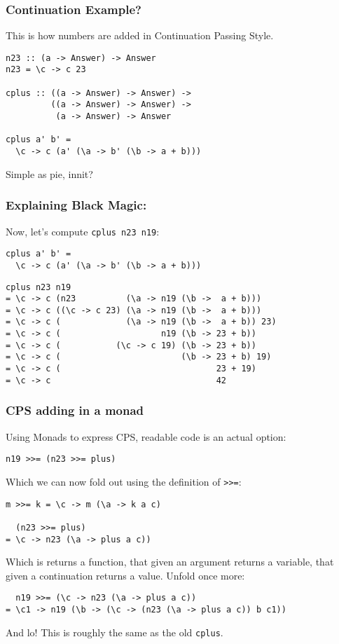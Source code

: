 \documentclass{beamer}
\begin{document}
\begin{frame}[fragile]
\frametitle{Continuation Example?}
\lstset{basicstyle=\footnotesize\ttfamily}
This is how numbers are added in Continuation Passing Style.
\begin{lstlisting}
n23 :: (a -> Answer) -> Answer
n23 = \c -> c 23

cplus :: ((a -> Answer) -> Answer) -> 
         ((a -> Answer) -> Answer) -> 
          (a -> Answer) -> Answer
          
cplus a' b' = 
  \c -> c (a' (\a -> b' (\b -> a + b)))
\end{lstlisting}
\pause Simple as pie, innit?
\end{frame}

\begin{frame}[fragile]
\frametitle{Explaining Black Magic:}
\lstset{basicstyle=\footnotesize\ttfamily}
Now, let's compute \texttt{cplus n23 n19}: 
\begin{lstlisting}
cplus a' b' = 
  \c -> c (a' (\a -> b' (\b -> a + b)))
\end{lstlisting}
\pause
\begin{lstlisting}
cplus n23 n19
= \c -> c (n23          (\a -> n19 (\b ->  a + b))) 
= \c -> c ((\c -> c 23) (\a -> n19 (\b ->  a + b)))
= \c -> c (             (\a -> n19 (\b ->  a + b)) 23)
= \c -> c (                    n19 (\b -> 23 + b))
= \c -> c (           (\c -> c 19) (\b -> 23 + b))
= \c -> c (                        (\b -> 23 + b) 19)
= \c -> c (                               23 + 19)
= \c -> c                                 42
\end{lstlisting}
\lstset{language=Haskell}


\end{frame}



\begin{frame}[fragile]
\frametitle{CPS adding in a monad}
Using Monads to express CPS, readable code is an actual option:

\begin{lstlisting}
n19 >>= (n23 >>= plus)
\end{lstlisting}
Which we can now fold out using the definition of \texttt{>>=}:
\pause
\begin{lstlisting}
m >>= k = \c -> m (\a -> k a c)

  (n23 >>= plus)
= \c -> n23 (\a -> plus a c))
\end{lstlisting}
Which is returns a function, that given an argument returns a variable, that
given a continuation returns a value. Unfold once more:
\pause
\begin{lstlisting}
  n19 >>= (\c -> n23 (\a -> plus a c))
= \c1 -> n19 (\b -> (\c -> (n23 (\a -> plus a c)) b c1))
\end{lstlisting}

\pause And lo! This is roughly the same as the old \texttt{cplus}.
\end{frame}
\end{document}
